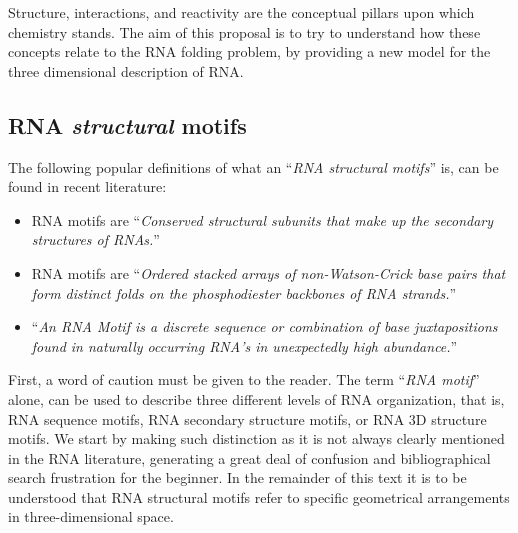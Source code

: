 Structure, interactions, and reactivity are the conceptual pillars
upon which chemistry stands. The aim of this proposal is to try to
understand how these concepts relate to the RNA folding problem, by
providing a new model for the three dimensional description of RNA.


\subsection{RNA \textit{structural} motifs}
The following popular definitions of what an ``\textit{RNA structural
  motifs}'' is, can be found in recent literature:
\begin{itemize}
\item{RNA motifs are ``\textit{Conserved  structural subunits that  make up the  secondary
structures of RNAs.}''\cite{holbrook2005}}
\item{RNA motifs are ``\textit{Ordered stacked arrays of
non-Watson-Crick  base pairs that  form distinct  folds  on  the
phosphodiester backbones of  RNA strands.}''\cite{leontis2003}} 
\item{``\textit{An RNA Motif is a discrete sequence or combination of base
juxtapositions found in naturally occurring RNA's in unexpectedly high
abundance.}''\cite{moore1999}}
\end{itemize}
First, a word of caution must be given to the reader. The term
``\textit{RNA motif}'' alone, can be used to describe three different
levels of RNA organization, that is, RNA sequence motifs, RNA
secondary structure motifs, or RNA 3D structure motifs. We start by
making such distinction as it is not always clearly mentioned in the RNA
literature, generating a great deal of confusion and bibliographical
search frustration for the beginner. In the remainder of
this text it is to be understood that RNA structural motifs refer to
specific geometrical arrangements in three-dimensional space.

